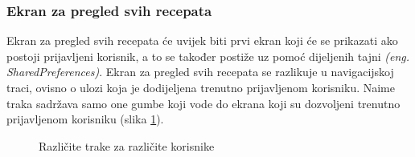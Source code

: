 \documentclass[times, utf8, zavrsni]{fer}
\begin{document}
\subsubsection{Ekran za pregled svih recepata}
Ekran za pregled svih recepata će uvijek biti prvi ekran koji će se prikazati ako postoji
prijavljeni korisnik, a to se također postiže uz pomoć dijeljenih tajni \textit{(eng. SharedPreferences)}.
Ekran za pregled svih recepata se razlikuje u navigacijskoj traci, ovisno o ulozi koja je dodijeljena trenutno prijavljenom korisniku.
Naime traka sadržava samo one gumbe koji vode do ekrana koji su dozvoljeni
trenutno prijavljenom korisniku (slika \ref{fig:tracks}).
\begin{figure}[h]
      \centering
      \caption{Različite trake za različite korisnike}
      \label{fig:tracks}
\end{figure}
\end{document}
